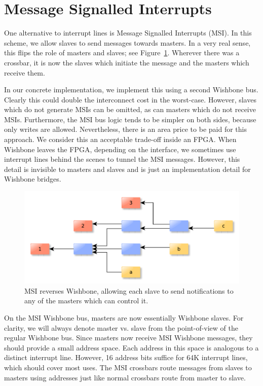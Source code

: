 \documentclass[a4paper]{jacow}
\begin{document}
\section{Message Signalled Interrupts}

One alternative to interrupt lines is Message Signalled Interrupts (MSI).
In this scheme, we allow slaves to send messages towards masters.
In a very real sense, this flips the role of masters and slaves;
see Figure~\ref{fig:good-msi}.
Wherever there was a crossbar, it is now the slaves which initiate the
message and the masters which receive them.

In our concrete implementation, 
we implement this using a second Wishbone bus.
Clearly this could double the interconnect cost in the worst-case.
However, slaves which do not generate MSIs can be omitted,
as can masters which do not receive MSIs.
Furthermore, the MSI bus logic tends to be simpler on both sides,
because only writes are allowed.
Nevertheless, there is an area price to be paid for this approach.
We consider this an acceptable trade-off inside an FPGA.
When Wishbone leaves the FPGA, depending on the interface, we sometimes
use interrupt lines behind the scenes to tunnel the MSI messages.
However, this detail is invisible to masters and slaves and is just an
implementation detail for Wishbone bridges.

\begin{figure}[t]
  \centering
  \includegraphics*[width=\columnwidth]{good-msi}
  \caption{MSI reverses Wishbone, allowing each slave to send notifications to
  any of the masters which can control it.}
  \label{fig:good-msi}
\end{figure}

On the MSI Wishbone bus, masters are now essentially Wishbone slaves.
For clarity, we will always denote master vs. slave from the point-of-view of
the regular Wishbone bus.
Since masters now receive MSI Wishbone messages, they should provide a small address space.
Each address in this space is analogous to a distinct interrupt line.
However, 16 address bits suffice for 64K interrupt lines, which should cover most uses.
The MSI crossbars route messages from slaves to masters using addresses just like normal
crossbars route from master to slave.
\end{document}
